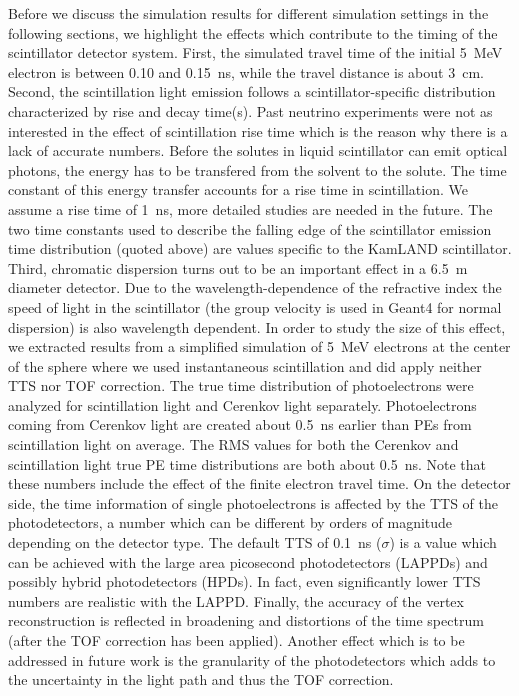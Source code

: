 \documentclass[aps,prc,twocolumn,groupedaddress,showpacs,amsmath,amssymb,floatfix,superscriptaddress]{revtex4}
\begin{document}
Before we discuss the simulation results for different simulation settings in the following sections, we highlight the effects which contribute to the timing of the scintillator detector system. First, the simulated travel time of the initial 5~MeV electron is between 0.10 and 0.15~ns, while the travel distance is about 3~cm. Second, the scintillation light emission follows a scintillator-specific distribution characterized by rise and decay time(s). Past neutrino experiments were not as interested in the effect of scintillation rise time which is the reason why there is a lack of accurate numbers. Before the solutes in liquid scintillator can emit optical photons, the energy has to be transfered from the solvent to the solute. The time constant of this energy transfer accounts for a rise time in scintillation. We assume a rise time of 1~ns, more detailed studies are needed in the future. The two time constants used to describe the falling edge of the scintillator emission time distribution (quoted above) are values specific to the KamLAND scintillator. Third, chromatic dispersion turns out to be an important effect in a 6.5~m diameter detector. Due to the wavelength-dependence of the refractive index the speed of light in the scintillator (the group velocity is used in Geant4 for normal dispersion) is also wavelength dependent. In order to study the size of this effect, we extracted results from a simplified simulation of 5~MeV electrons at the center of the sphere where we used instantaneous scintillation and did apply neither TTS nor TOF correction. The true time distribution of photoelectrons were analyzed for scintillation light and Cerenkov light separately. Photoelectrons coming from Cerenkov light are created about 0.5~ns earlier than PEs from scintillation light on average. The RMS values for both the Cerenkov and scintillation light true PE time distributions are both about 0.5~ns. Note that these numbers include the effect of the finite electron travel time. On the detector side, the time information of single photoelectrons is affected by the TTS of the photodetectors, a number which can be different by orders of magnitude depending on the detector type. The default TTS of 0.1~ns ($\sigma$) is a value which can be achieved with the large area picosecond photodetectors (LAPPDs)\cite{LAPPDSum,LAPPDTDR} and possibly hybrid photodetectors (HPDs)\cite{hpdThesis}. In fact, even significantly lower TTS numbers are realistic with the LAPPD. Finally, the accuracy of the vertex reconstruction is reflected in broadening and distortions of the time spectrum (after the TOF correction has been applied). Another effect which is to be addressed in future work is the granularity of the photodetectors which adds to the uncertainty in the light path and thus the TOF correction.   
\end{document}
